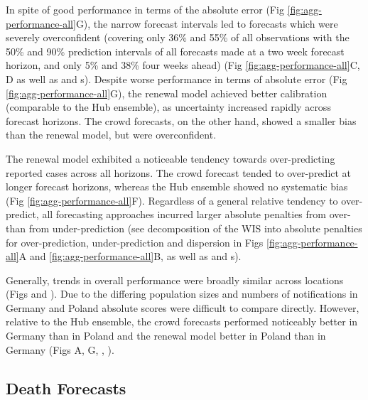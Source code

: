 \documentclass[10pt,letterpaper]{article}
\begin{document}
In spite of good performance in terms of the absolute error (Fig
\ref{fig:agg-performance-all}G), the narrow forecast intervals led to
forecasts which were severely overconfident (covering only 36\% and 55\%
of all observations with the 50\% and 90\% prediction intervals of all
forecasts made at a two week forecast horizon, and only 5\% and 38\%
four weeks ahead) (Fig \ref{fig:agg-performance-all}C, D as well as
 and s). Despite
worse performance in terms of absolute error (Fig
\ref{fig:agg-performance-all}G), the renewal model achieved better
calibration (comparable to the Hub ensemble), as uncertainty increased
rapidly across forecast horizons. The crowd forecasts, on the other
hand, showed a smaller bias than the renewal model, but were
overconfident.

The renewal model exhibited a noticeable tendency towards
over-predicting reported cases across all horizons. The crowd forecast
tended to over-predict at longer forecast horizons, whereas the Hub
ensemble showed no systematic bias (Fig \ref{fig:agg-performance-all}F).
Regardless of a general relative tendency to over-predict, all
forecasting approaches incurred larger absolute penalties from over-
than from under-prediction (see decomposition of the WIS into absolute
penalties for over-prediction, under-prediction and dispersion in Figs
\ref{fig:agg-performance-all}A and \ref{fig:agg-performance-all}B, as
well as  and s).

Generally, trends in overall performance were broadly similar across
locations (Figs  and
). Due to the differing
population sizes and numbers of notifications in Germany and Poland
absolute scores were difficult to compare directly. However, relative to
the Hub ensemble, the crowd forecasts performed noticeably better in
Germany than in Poland and the renewal model better in Poland than in
Germany (Figs A,
G,
,
).

\hypertarget{death-forecasts}{%
\subsection{Death Forecasts}\label{death-forecasts}}
\end{document}
